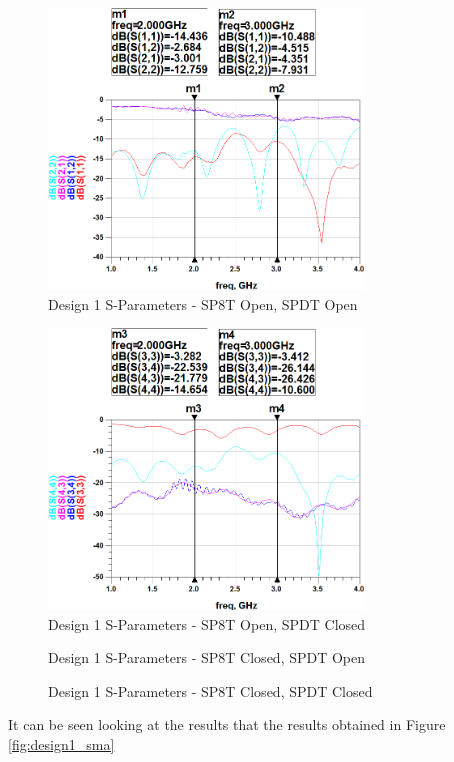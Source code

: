 \documentclass[12pt,openany,a4paper]{book}
\begin{document}
\begin{figure}[H]
	\centering
	\includegraphics[width=0.75\textwidth]{Design1-1.png}
	\caption{Design 1 S-Parameters - SP8T Open, SPDT Open}
	\label{fig:design1_1}
\end{figure} 


\begin{figure}[H]
	\centering
	\includegraphics[width=0.75\textwidth]{Design1-2.png}
	\caption{Design 1 S-Parameters - SP8T Open, SPDT Closed}
	\label{fig:design1_2}
\end{figure} 
\begin{figure}[H]
	\centering
	\caption{Design 1 S-Parameters - SP8T Closed, SPDT Open}
	\label{fig:design1_3}
\end{figure} 
\begin{figure}[H]
	\centering
	\caption{Design 1 S-Parameters - SP8T Closed, SPDT Closed}
	\label{fig:design1_4}
\end{figure} 
It can be seen looking at the results that the results obtained in Figure \ref{fig:design1_sma}
\end{document}

